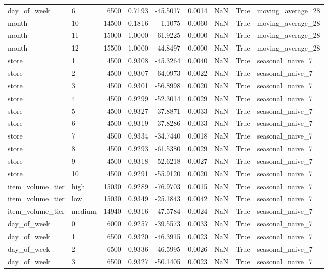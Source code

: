 \begin{table}
\begin{tabular}{llrrrrrrl}
day\_of\_week & 6 & 6500 & 0.7193 & -45.5017 & 0.0014 & NaN & True & moving\_average\_28 \\
month & 10 & 14500 & 0.1816 & 1.1075 & 0.0060 & NaN & True & moving\_average\_28 \\
month & 11 & 15000 & 1.0000 & -61.9225 & 0.0000 & NaN & True & moving\_average\_28 \\
month & 12 & 15500 & 1.0000 & -44.8497 & 0.0000 & NaN & True & moving\_average\_28 \\
store & 1 & 4500 & 0.9308 & -45.3264 & 0.0040 & NaN & True & seasonal\_naive\_7 \\
store & 2 & 4500 & 0.9307 & -64.0973 & 0.0022 & NaN & True & seasonal\_naive\_7 \\
store & 3 & 4500 & 0.9301 & -56.8998 & 0.0020 & NaN & True & seasonal\_naive\_7 \\
store & 4 & 4500 & 0.9299 & -52.3014 & 0.0029 & NaN & True & seasonal\_naive\_7 \\
store & 5 & 4500 & 0.9327 & -37.8871 & 0.0033 & NaN & True & seasonal\_naive\_7 \\
store & 6 & 4500 & 0.9319 & -37.8286 & 0.0033 & NaN & True & seasonal\_naive\_7 \\
store & 7 & 4500 & 0.9334 & -34.7440 & 0.0018 & NaN & True & seasonal\_naive\_7 \\
store & 8 & 4500 & 0.9293 & -61.5380 & 0.0029 & NaN & True & seasonal\_naive\_7 \\
store & 9 & 4500 & 0.9318 & -52.6218 & 0.0027 & NaN & True & seasonal\_naive\_7 \\
store & 10 & 4500 & 0.9291 & -55.9120 & 0.0020 & NaN & True & seasonal\_naive\_7 \\
item\_volume\_tier & high & 15030 & 0.9289 & -76.9703 & 0.0015 & NaN & True & seasonal\_naive\_7 \\
item\_volume\_tier & low & 15030 & 0.9349 & -25.1843 & 0.0042 & NaN & True & seasonal\_naive\_7 \\
item\_volume\_tier & medium & 14940 & 0.9316 & -47.5784 & 0.0024 & NaN & True & seasonal\_naive\_7 \\
day\_of\_week & 0 & 6000 & 0.9257 & -39.5573 & 0.0033 & NaN & True & seasonal\_naive\_7 \\
day\_of\_week & 1 & 6500 & 0.9320 & -46.3915 & 0.0023 & NaN & True & seasonal\_naive\_7 \\
day\_of\_week & 2 & 6500 & 0.9336 & -46.5995 & 0.0026 & NaN & True & seasonal\_naive\_7 \\
day\_of\_week & 3 & 6500 & 0.9327 & -50.1405 & 0.0023 & NaN & True & seasonal\_naive\_7 \\

\end{tabular}
\end{table}
